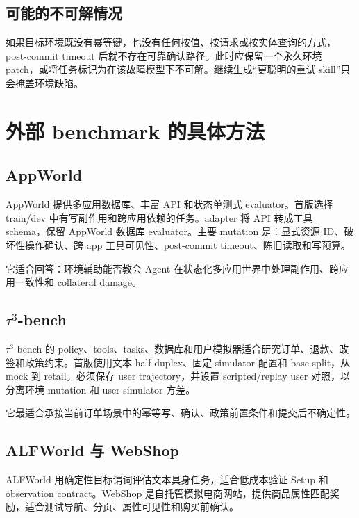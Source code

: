 \documentclass[11pt,a4paper,fontset=fandol]{ctexart}
\begin{document}
\subsection{可能的不可解情况}

如果目标环境既没有幂等键，也没有任何按值、按请求或按实体查询的方式，post-commit timeout 后就不存在可靠确认路径。此时应保留一个永久环境 patch，或将任务标记为在该故障模型下不可解。继续生成“更聪明的重试 skill”只会掩盖环境缺陷。

\section{外部 benchmark 的具体方法}

\subsection{AppWorld}

AppWorld 提供多应用数据库、丰富 API 和状态单测式 evaluator\cite{appworld}。首版选择 train/dev 中有写副作用和跨应用依赖的任务。adapter 将 API 转成工具 schema，保留 AppWorld 数据库 evaluator。主要 mutation 是：显式资源 ID、破坏性操作确认、跨 app 工具可见性、post-commit timeout、陈旧读取和写预算。

它适合回答：环境辅助能否教会 Agent 在状态化多应用世界中处理副作用、跨应用一致性和 collateral damage。

\subsection{$\tau^3$-bench}

$\tau^3$-bench 的 policy、tools、tasks、数据库和用户模拟器适合研究订单、退款、改签和政策约束\cite{tau3repo}。首版使用文本 half-duplex、固定 simulator 配置和 base split，从 mock 到 retail。必须保存 user trajectory，并设置 scripted/replay user 对照，以分离环境 mutation 和 user simulator 方差。

它最适合承接当前订单场景中的幂等写、确认、政策前置条件和提交后不确定性。

\subsection{ALFWorld 与 WebShop}

ALFWorld 用确定性目标谓词评估文本具身任务\cite{alfworld}，适合低成本验证 Setup 和 observation contract。WebShop 是自托管模拟电商网站，提供商品属性匹配奖励\cite{webshop}，适合测试导航、分页、属性可见性和购买前确认。
\end{document}
